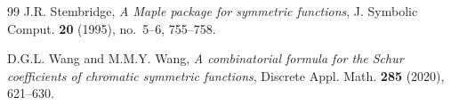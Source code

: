 \documentclass[11pt]{amsart}
\numberwithin{equation}{section}
\theoremstyle{remark}
\begin{document}
\begin{thebibliography}{99}
\label{ref:Stembridge1995} J.R. Stembridge, \emph{A Maple package for symmetric functions}, J. Symbolic Comput. \textbf{20} (1995), no.~5--6, 755--758.

\label{ref:WangWang2020} D.G.L. Wang and M.M.Y. Wang, \emph{A combinatorial formula for the Schur coefficients of chromatic symmetric functions}, Discrete Appl. Math. \textbf{285} (2020), 621--630.

\end{thebibliography}
\end{document}
